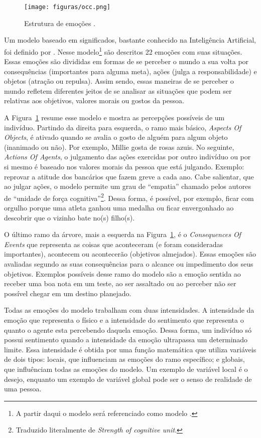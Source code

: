 \begin{figure}[t]
  \centering
    \texttt{[image: figuras/occ.png]}
  \caption{Estrutura de emoções \cite{ortony1988cse}.}
  \label{fig:occ_model}
\end{figure}

Um modelo baseado em significados, bastante conhecido na Inteligência
Artificial, foi definido por \citet{ortony1988cse}. Nesse modelo\footnote{A
partir daqui o modelo será referenciado como modelo \occ.} são descritos
22 emoções com suas situações. Essas emoções são divididas em formas de se
perceber o mundo a sua volta por consequências (importantes para alguma meta),
ações (julga a responsabilidade) e objetos (atração ou repulsa). Assim sendo,
essas maneiras de se perceber o mundo refletem diferentes jeitos de se
analisar as situações que podem ser relativas aos objetivos, valores morais ou
gostos da pessoa.

A Figura~\ref{fig:occ_model} resume esse modelo e mostra as
percepções possíveis de um indivíduo.  Partindo da direita para esquerda, o
ramo mais básico, \emph{Aspects Of Objects}, é ativado quando se avalia o
gosto de alguém para algum objeto (inanimado ou não). Por exemplo, Millie
gosta de rosas azuis. No seguinte, \emph{Actions Of Agents}, o julgamento das
ações exercidas por outro indivíduo ou por si mesmo é baseado nos
valores morais da pessoa que está julgando. Exemplo: reprovar a atitude dos
bancários que fazem greve a cada ano. Cabe salientar, que ao julgar ações, o
modelo permite um grau de ``empatia'' chamado pelos autores de ``unidade de
força cognitiva''\footnote{Traduzido literalmente de \emph{Strength of
cognitive unit}.}. Dessa forma, é possível, por exemplo, ficar com orgulho
porque uma atleta ganhou uma medalha ou ficar envergonhado ao descobrir que o
vizinho bate no(s) filho(s).

O último ramo da árvore, mais a esquerda na Figura~\ref{fig:occ_model}, é o
\emph{Consequences Of Events} que representa as coisas que aconteceram (e
foram consideradas importantes), acontecem ou acontecerão (objetivos
almejados)\dev{}. Essas emoções são avaliadas segundo as suas consequências
para o alcance ou impedimento dos seus objetivos. Exemplos possíveis desse
ramo do modelo são a emoção sentida ao receber uma boa nota em um teste, ao
ser assaltado ou ao perceber não ser possível chegar em um destino planejado.

Todas as emoções do modelo trabalham com duas intensidades. A intensidade da
emoção que representa o físico e a intensidade do sentimento que representa o
quanto o agente esta percebendo daquela emoção. Dessa forma, um indivíduo só
possui sentimento quando a intensidade da emoção ultrapassa um
determinado limite\dev{}.  Essa intensidade é obtida por uma função matemática
que utiliza variáveis de dois tipos: locais, que influenciam as emoções do ramo
específico; e globais, que influênciam todas as emoções do modelo.  Um exemplo
de variável local é o desejo, enquanto um exemplo de variável global pode ser
o senso de realidade de uma pessoa.

